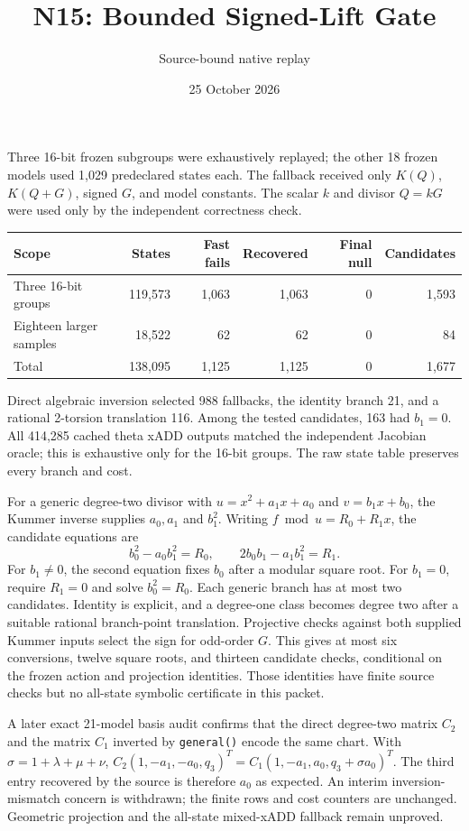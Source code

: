 \documentclass[11pt]{article}
\title{N15: Bounded Signed-Lift Gate}
\author{Source-bound native replay}
\date{25 October 2026}
\begin{document}
\maketitle
\noindent Three 16-bit frozen subgroups were exhaustively replayed; the
other 18 frozen models used 1,029 predeclared states each. The fallback
received only $K(Q)$, $K(Q+G)$, signed $G$, and model constants. The scalar
$k$ and divisor $Q=kG$ were used only by the independent correctness check.

\begin{center}\small
\begin{tabular}{lrrrrr}
\toprule
Scope & States & Fast fails & Recovered & Final null & Candidates\\
\midrule
Three 16-bit groups & 119,573 & 1,063 & 1,063 & 0 & 1,593\\
Eighteen larger samples & 18,522 & 62 & 62 & 0 & 84\\
\midrule
Total & 138,095 & 1,125 & 1,125 & 0 & 1,677\\
\bottomrule
\end{tabular}
\end{center}

\noindent Direct algebraic inversion selected 988 fallbacks, the identity
branch 21, and a rational 2-torsion translation 116. Among the tested
candidates, 163 had $b_1=0$. All 414,285 cached theta xADD outputs matched
the independent Jacobian oracle; this is exhaustive only for the 16-bit
groups. The raw state table preserves every branch and cost.

\noindent For a generic degree-two divisor with
$u=x^2+a_1x+a_0$ and $v=b_1x+b_0$, the Kummer inverse supplies $a_0,a_1$
and $b_1^2$. Writing $f\bmod u=R_0+R_1x$, the candidate equations are
\[
 b_0^2-a_0b_1^2=R_0,\qquad 2b_0b_1-a_1b_1^2=R_1.
\]
For $b_1\ne0$, the second equation fixes $b_0$ after a modular square
root. For $b_1=0$, require $R_1=0$ and solve $b_0^2=R_0$. Each generic
branch has at most two candidates. Identity is explicit, and a degree-one
class becomes degree two after a suitable rational branch-point
translation. Projective checks against both supplied Kummer inputs select
the sign for odd-order $G$. This gives at most six conversions, twelve square
roots, and thirteen candidate checks, conditional on the frozen action and
projection identities. Those identities have finite source checks but no
all-state symbolic certificate in this packet.

\noindent A later exact 21-model basis audit confirms that the direct
degree-two matrix $C_2$ and the matrix $C_1$ inverted by \texttt{general()}
encode the same chart. With $\sigma=1+\lambda+\mu+\nu$,
$C_2(1,-a_1,-a_0,q_3)^T=C_1(1,-a_1,a_0,q_3+\sigma a_0)^T$.
The third entry recovered by the source is therefore $a_0$ as expected.
An interim inversion-mismatch concern is withdrawn; the finite rows and
cost counters are unchanged. Geometric projection and the all-state
mixed-xADD fallback remain unproved.
\end{document}
